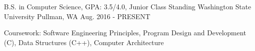 \begin{cventries}
  \cventry
    {B.S. in Computer Science, GPA: 3.5/4.0, Junior Class Standing}
    {Washington State University}
    {Pullman, WA}
    {Aug. 2016 - PRESENT}
    {
      \begin{cvitems}
        \item {Coursework: Software Engineering Principles, Program Design and Development (C), Data Structures (C++), Computer Architecture}
      \end{cvitems}
    }
\end{cventries}